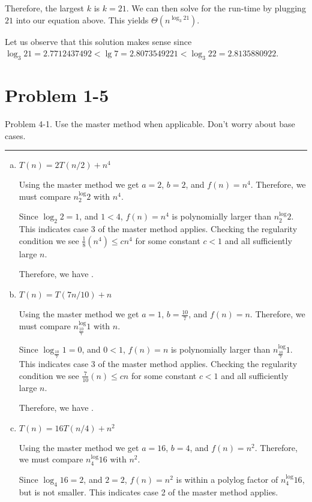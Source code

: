 \documentclass[11pt]{article}
\def\separateline{\medskip\hrule\medskip}
\begin{document}
Therefore, the largest $k$ is $k = 21$. We can then solve for the run-time by plugging $21$ into our equation above. This yields $\Theta(n^{\log_3{21}})$.

Let us observe that this solution makes sense since $\log_3{21} = 2.7712437492 < \lg{7} = 2.8073549221 < \log_3{22} = 2.8135880922$.

\newpage

\section{Problem 1-5}
Problem 4-1. Use the master method when applicable. Don’t worry about base cases.
\separateline

\begin{enumerate}[(a)]
\item $T(n) = 2T(n/2) + n^4$

Using the master method we get $a = 2$, $b = 2$, and $f(n) = n^4$. Therefore, we must compare $n^\log_2{2}$ with $n^4$.

Since $\log_2{2} = 1$, and $1 < 4$, $f(n) = n^4$ is polynomially larger than $n^\log_2{2}$. This indicates case 3 of the master method applies. Checking the regularity condition we see $\frac{1}{8}(n^4) \leq cn^4$ for some constant $c < 1$ and all sufficiently large $n$.

Therefore, we have .\\


\item $T(n) = T(7n/10) + n$


Using the master method we get $a = 1$, $b = \frac{10}{7}$, and $f(n) = n$. Therefore, we must compare $n^\log_\frac{10}{7} {1}$ with $n$.

Since $\log_\frac{10}{7} {1} = 0$, and $0 < 1$, $f(n) = n$ is polynomially larger than $n^\log_\frac{10}{7} {1}$. This indicates case 3 of the master method applies. Checking the regularity condition we see $\frac{7}{10}(n) \leq cn$ for some constant $c < 1$ and all sufficiently large $n$.

Therefore, we have .\\


\item $T(n) = 16T(n/4) + n^2$


Using the master method we get $a = 16$, $b = 4$, and $f(n) = n^2$. Therefore, we must compare $n^\log_4{16}$ with $n^2$.

Since $\log_4{16} = 2$, and $2 = 2$, $f(n) = n^2$ is within a polylog factor of $n^\log_4{16}$, but is not smaller. This indicates case 2 of the master method applies.


\end{enumerate}
\end{document}
